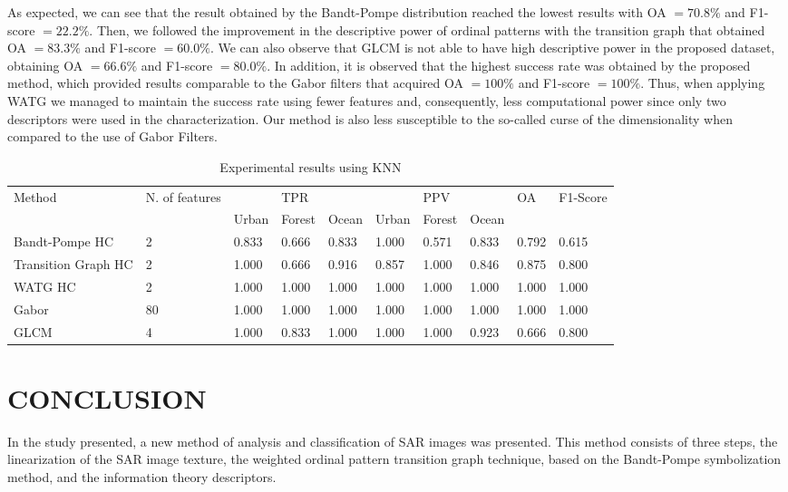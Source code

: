 \documentclass[journal]{IEEEtran}
\begin{document}
As expected, we can see that the result obtained by the Bandt-Pompe distribution reached the lowest results with OA $= 70.8\%$ and F1-score $= 22.2\%$.
Then, we followed the improvement in the descriptive power of ordinal patterns with the transition graph that obtained OA $= 83.3\%$ and F1-score $= 60.0\%$.
We can also observe that GLCM is not able to have high descriptive power in the proposed dataset, obtaining OA $= 66.6\%$ and F1-score $= 80.0\%$.
In addition, it is observed that the highest success rate was obtained by the proposed method, which provided results comparable to the Gabor filters that acquired OA $= 100\%$ and F1-score $= 100\%$.
Thus, when applying WATG we managed to maintain the success rate using fewer features and, consequently, less computational power since only two descriptors were used in the characterization. {\color{red}Our method is also less susceptible to the so-called curse of the dimensionality when compared to the use of Gabor Filters.}

\begin{table}[hbt]
\centering
\caption{Experimental results using KNN}
\label{tab:result1}
\begin{tabular}{|l|l|lll|lll|l|l|}
\hline
Method      & N. of features         &       & TPR   &       &       & PPV    &       & OA  & F1-Score \\ \cline{3-8} 
                 &   & Urban & Forest & Ocean & Urban & Forest & Ocean & &  \\\hline
Bandt-Pompe HC   & 2 & 0.833 &  0.666  & 0.833 & 1.000 & 0.571  & 0.833 & 0.792 &  0.615  \\ 
Transition Graph HC & 2  & 1.000 & 0.666  & 0.916 & 0.857 & 1.000  & 0.846 & 0.875 & 0.800 \\
WATG HC         & 2  & 1.000 & 1.000  & 1.000 & 1.000 & 1.000  & 1.000 & 1.000 & 1.000 \\ 
Gabor           & 80  & 1.000 & 1.000  & 1.000 & 1.000 & 1.000  & 1.000 & 1.000 & 1.000\\
GLCM            & 4   & 1.000 & 0.833  & 1.000 & 1.000 & 1.000  & 0.923 & 0.666 & 0.800\\
\hline
\end{tabular}
\end{table}

\section{CONCLUSION}\label{Conclusion}

In the study presented, a new method of analysis and classification of SAR images was presented.
This method consists of three steps, the linearization of the SAR image texture, the weighted ordinal pattern transition graph technique, based on the Bandt-Pompe symbolization method, and the information theory descriptors.
\end{document}
